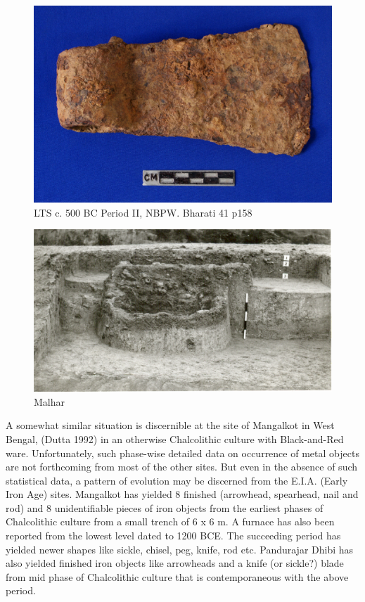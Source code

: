 \begin{figure}[H]
\renewcommand{\thefigure}{13B}
\includegraphics[scale=0.4]{images/chapter-4/fig013B.jpg}
\caption{LTS c. 500 BC Period II, NBPW. Bharati 41 p158}\label{chapter-4-fig13B}
\end{figure}

\begin{figure}[H]
\setcounter{figure}{13}
\includegraphics[scale=0.4]{images/chapter-4/fig014.jpg}
\caption{Malhar}\label{chapter-4-fig14}
\end{figure}

A somewhat similar situation is discernible at the site of Mangalkot in West Bengal, (Dutta 1992) in an otherwise Chalcolithic culture with Black-and-Red ware. Unfortunately, such phase-wise detailed data on occurrence of metal objects are not forthcoming from most of the other sites. But even in the absence of such statistical data, a pattern of evolution may be discerned from the E.I.A. (Early Iron Age) sites. Mangalkot has yielded 8 finished (arrowhead, spearhead, nail and rod) and 8 unidentifiable pieces of iron objects from the earliest phases of Chalcolithic culture from a small trench of 6 x 6 m. A furnace has also been reported from the lowest level dated to 1200 BCE. The succeeding period has yielded newer shapes like sickle, chisel, peg, knife, rod etc. Pandurajar Dhibi has also yielded finished iron objects like arrowheads and a knife (or sickle?) blade from mid phase of Chalcolithic culture that is contemporaneous with the above period.

